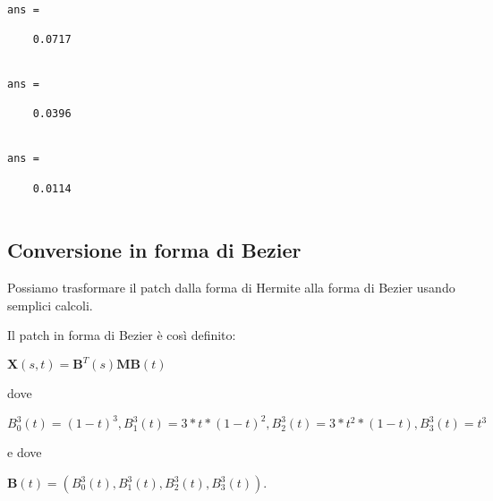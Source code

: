 \documentclass[11pt]{article}
\begin{document}
    \begin{Verbatim}[commandchars=\\\{\}]

ans =

    0.0717


ans =

    0.0396


ans =

    0.0114


    \end{Verbatim}

    \hypertarget{conversione-in-forma-di-bezier}{%
\subsection{Conversione in forma di
Bezier}\label{conversione-in-forma-di-bezier}}

Possiamo trasformare il patch dalla forma di Hermite alla forma di
Bezier usando semplici calcoli.

Il patch in forma di Bezier è così definito:

\(\mathbf{X}(s,t) = \mathbf{B}^T(s)\mathbf{M B}(t)\)

dove

\(B^3_0(t) = (1 - t)^3, B^3_1(t) = 3*t*(1 - t)^2, B^3_2(t) = 3*t^2*(1 - t), B^3_3(t) = t^3\)

e dove

\(\mathbf{B}(t) = (B^3_0(t), B^3_1(t), B^3_2(t), B^3_3(t))\).
\end{document}
